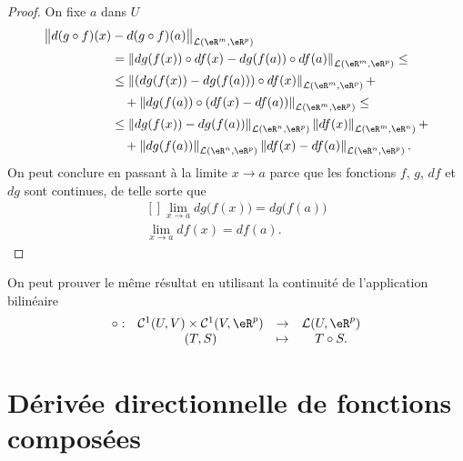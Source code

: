 \begin{proof} On fixe $a$ dans $U$ 
  \begin{equation}
    \begin{aligned}
     \big\|d(g\circ f)(x)&-d(g\circ f)(a)\big\|_{\mathcal{L}(\eR^m,\eR^p)}\\
     &=\left\|dg(f(x))\circ df(x)-dg(f(a))\circ df(a)\right\|_{\mathcal{L}(\eR^m,\eR^p)}\leq\\
&\leq \left\|\left(dg(f(x))-dg(f(a))\right)\circ df(x)\right\|_{\mathcal{L}(\eR^m,\eR^p)}+\\
&\quad+ \left\|dg(f(a))\circ \left(df(x)-df(a)\right)\right\|_{\mathcal{L}(\eR^m,\eR^p)}\leq\\
&\leq \left\|dg(f(x))-dg(f(a))\right\|_{\mathcal{L}(\eR^n,\eR^p)}\left\| df(x)\right\|_{\mathcal{L}(\eR^m,\eR^n)}+\\
&\quad+ \left\|dg(f(a))\right\|_{\mathcal{L}(\eR^n,\eR^p)}\left\| df(x)-df(a)\right\|_{\mathcal{L}(\eR^n,\eR^p)}.\\
    \end{aligned}
  \end{equation}
On peut conclure en passant à la limite $x\to a$ parce que les fonctions $f$, $g$, $df$ et $dg$ sont continues, de telle sorte que
\begin{equation}
	\begin{aligned}[]
		\lim_{x\to a} dg\big( f(x) \big)=dg\big( f(a) \big)\\
		\lim_{x\to a} df(x)=df(a).
	\end{aligned}
\end{equation}
\end{proof}

\begin{remark}
  On peut prouver le même résultat en utilisant la continuité de l'application bilinéaire 
\begin{equation}
  \begin{array}{rccc}
    \circ : & \mathcal{C}^1(U,V)\times\mathcal{C}^1(V,\eR^p)  & \to & \mathcal{L}(U, \eR^p)\\
& (T,S)& \mapsto & T\circ S.
  \end{array}
\end{equation}
\end{remark}
\section{Dérivée directionnelle de fonctions composées}		\label{SecDerDirFnComp}

